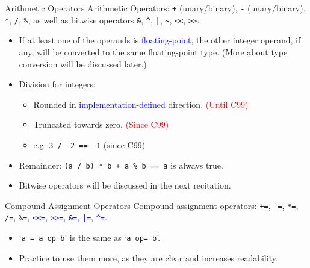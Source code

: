 \documentclass[handout]{beamer}
\newcommand{\red}[1]{\textcolor{red}{#1}}
\newcommand{\blue}[1]{\textcolor{blue}{#1}}
\newcommand{\ttt}[1]{\texttt{#1}}
\begin{document}
\begin{frame}{Arithmetic Operators}
    Arithmetic Operators: \ttt{+} (unary/binary), \ttt{-} (unary/binary), \ttt{*}, \ttt{/}, \ttt{\%}, as well as bitwise operators \ttt{\&}, \ttt{\^{}}, \ttt{|}, \ttt{\~}, \ttt{<<}, \ttt{>>}.
    \begin{itemize}
        \item If at least one of the operands is \blue{floating-point}, the other integer operand, if any, will be converted to the same floating-point type. (More about type conversion will be discussed later.)
        \pause
        \item Division for integers:
        \begin{itemize}
            \item Rounded in \blue{implementation-defined} direction. \red{(Until C99)}
            \item Truncated towards zero. \red{(Since C99)}
            \item e.g. \ttt{3 / -2 == -1} (since C99)
        \end{itemize}
        \item Remainder: \ttt{(a / b) * b + a \% b == a} is always true.
        \pause
        \item Bitwise operators will be discussed in the next recitation.
    \end{itemize}
\end{frame}

\begin{frame}{Compound Assignment Operators}
    Compound assignment operators: \ttt{+=}, \ttt{-=}, \ttt{*=}, \ttt{/=}, \ttt{\%=}, \blue{\ttt{<<=}, \ttt{>>=}, \ttt{\&=}, \ttt{|=}, \ttt{\^{}=}}.
    \begin{itemize}
        \item `\ttt{a = a op b}' is the same as `\ttt{a op= b}'.
        \item Practice to use them more, as they are clear and increases readability.
    \end{itemize}
\end{frame}
\end{document}
